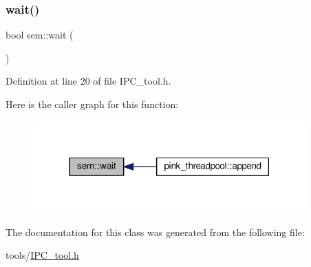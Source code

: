 \subsubsection{\texorpdfstring{wait()}{wait()}}
{\footnotesize\ttfamily bool sem\+::wait (\begin{DoxyParamCaption}{ }\end{DoxyParamCaption})\hspace{0.3cm}{\ttfamily [inline]}}



Definition at line 20 of file I\+P\+C\+\_\+tool.\+h.

Here is the caller graph for this function\+:\nopagebreak
\begin{figure}[H]
\begin{center}
\leavevmode
\includegraphics[width=297pt]{classsem_a0195e3b2273cb8d2c814778b0521e847_icgraph}
\end{center}
\end{figure}


The documentation for this class was generated from the following file\+:\begin{DoxyCompactItemize}
\item 
tools/\hyperlink{_i_p_c__tool_8h}{I\+P\+C\+\_\+tool.\+h}\end{DoxyCompactItemize}
